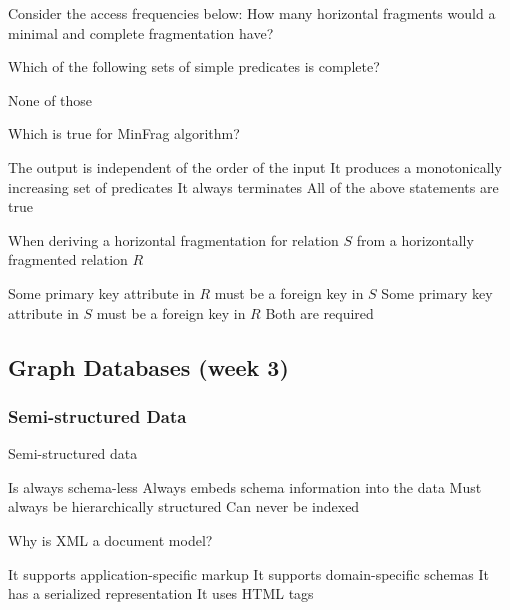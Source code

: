 \documentclass[12pt,a4paper,answers]{exam} %
\begin{document}
\begin{flushleft}
\begin{multicols*}{2}
\begin{questions}
\question Consider the access frequencies below:
How many horizontal fragments would a minimal and complete fragmentation have?
\begin{checkboxes}
\end{checkboxes}

\question Which of the following sets of simple predicates is complete?
\begin{checkboxes}
\CorrectChoice None of those
\end{checkboxes}

\question Which is true for MinFrag algorithm?
\begin{checkboxes}
\choice The output is independent of the order of the input
\choice It produces a monotonically increasing set of predicates
\CorrectChoice It always terminates
\choice All of the above statements are true
\end{checkboxes}


\question When deriving a horizontal fragmentation for relation $S$ from a horizontally fragmented relation $R$
\begin{checkboxes}
\CorrectChoice Some primary key attribute in $R$ must be a foreign key in $S$
\choice Some primary key attribute in $S$ must be a foreign key in $R$
\choice Both are required
\end{checkboxes}


\subsection{Graph Databases (week 3)} %
\subsubsection{Semi-structured Data}
\question Semi-structured data
\begin{checkboxes}
\choice Is always schema-less
\CorrectChoice Always embeds schema information into the data
\choice Must always be hierarchically structured
\choice Can never be indexed
\end{checkboxes}

\question Why is XML a document model?
\begin{checkboxes}
\choice It supports application-specific markup
\choice It supports domain-specific schemas
\CorrectChoice It has a serialized representation
\choice It uses HTML tags
\end{checkboxes}


\end{questions}
\end{multicols*}
\end{flushleft}
\end{document}
